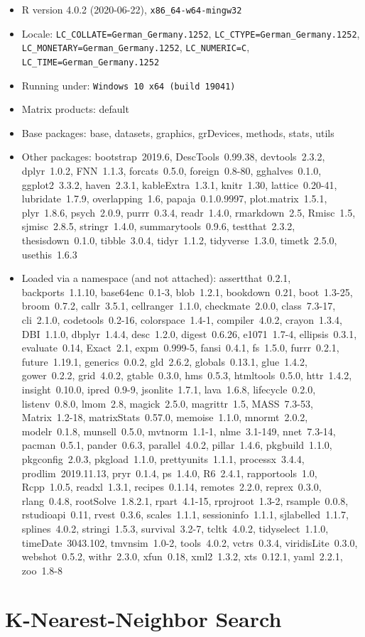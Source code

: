 \documentclass[12pt,twoside]{reedthesis}
\begin{document}
\begin{itemize}\raggedright
  \item R version 4.0.2 (2020-06-22), \verb|x86_64-w64-mingw32|
  \item Locale: \verb|LC_COLLATE=German_Germany.1252|, \verb|LC_CTYPE=German_Germany.1252|, \verb|LC_MONETARY=German_Germany.1252|, \verb|LC_NUMERIC=C|, \verb|LC_TIME=German_Germany.1252|
  \item Running under: \verb|Windows 10 x64 (build 19041)|
  \item Matrix products: default
  \item Base packages: base, datasets, graphics, grDevices, methods,
    stats, utils
  \item Other packages: bootstrap~2019.6, DescTools~0.99.38,
    devtools~2.3.2, dplyr~1.0.2, FNN~1.1.3, forcats~0.5.0,
    foreign~0.8-80, gghalves~0.1.0, ggplot2~3.3.2, haven~2.3.1,
    kableExtra~1.3.1, knitr~1.30, lattice~0.20-41, lubridate~1.7.9,
    overlapping~1.6, papaja~0.1.0.9997, plot.matrix~1.5.1, plyr~1.8.6,
    psych~2.0.9, purrr~0.3.4, readr~1.4.0, rmarkdown~2.5, Rmisc~1.5,
    sjmisc~2.8.5, stringr~1.4.0, summarytools~0.9.6, testthat~2.3.2,
    thesisdown~0.1.0, tibble~3.0.4, tidyr~1.1.2, tidyverse~1.3.0,
    timetk~2.5.0, usethis~1.6.3
  \item Loaded via a namespace (and not attached): assertthat~0.2.1,
    backports~1.1.10, base64enc~0.1-3, blob~1.2.1, bookdown~0.21,
    boot~1.3-25, broom~0.7.2, callr~3.5.1, cellranger~1.1.0,
    checkmate~2.0.0, class~7.3-17, cli~2.1.0, codetools~0.2-16,
    colorspace~1.4-1, compiler~4.0.2, crayon~1.3.4, DBI~1.1.0,
    dbplyr~1.4.4, desc~1.2.0, digest~0.6.26, e1071~1.7-4,
    ellipsis~0.3.1, evaluate~0.14, Exact~2.1, expm~0.999-5,
    fansi~0.4.1, fs~1.5.0, furrr~0.2.1, future~1.19.1, generics~0.0.2,
    gld~2.6.2, globals~0.13.1, glue~1.4.2, gower~0.2.2, grid~4.0.2,
    gtable~0.3.0, hms~0.5.3, htmltools~0.5.0, httr~1.4.2,
    insight~0.10.0, ipred~0.9-9, jsonlite~1.7.1, lava~1.6.8,
    lifecycle~0.2.0, listenv~0.8.0, lmom~2.8, magick~2.5.0,
    magrittr~1.5, MASS~7.3-53, Matrix~1.2-18, matrixStats~0.57.0,
    memoise~1.1.0, mnormt~2.0.2, modelr~0.1.8, munsell~0.5.0,
    mvtnorm~1.1-1, nlme~3.1-149, nnet~7.3-14, pacman~0.5.1,
    pander~0.6.3, parallel~4.0.2, pillar~1.4.6, pkgbuild~1.1.0,
    pkgconfig~2.0.3, pkgload~1.1.0, prettyunits~1.1.1, processx~3.4.4,
    prodlim~2019.11.13, pryr~0.1.4, ps~1.4.0, R6~2.4.1,
    rapportools~1.0, Rcpp~1.0.5, readxl~1.3.1, recipes~0.1.14,
    remotes~2.2.0, reprex~0.3.0, rlang~0.4.8, rootSolve~1.8.2.1,
    rpart~4.1-15, rprojroot~1.3-2, rsample~0.0.8, rstudioapi~0.11,
    rvest~0.3.6, scales~1.1.1, sessioninfo~1.1.1, sjlabelled~1.1.7,
    splines~4.0.2, stringi~1.5.3, survival~3.2-7, tcltk~4.0.2,
    tidyselect~1.1.0, timeDate~3043.102, tmvnsim~1.0-2, tools~4.0.2,
    vctrs~0.3.4, viridisLite~0.3.0, webshot~0.5.2, withr~2.3.0,
    xfun~0.18, xml2~1.3.2, xts~0.12.1, yaml~2.2.1, zoo~1.8-8
\end{itemize}
\hypertarget{r-knn-search}{%
\section{K-Nearest-Neighbor Search}\label{r-knn-search}}
\end{document}
